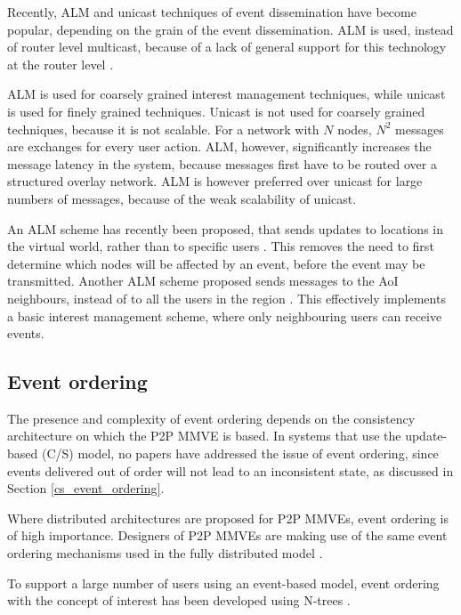 Recently, ALM and unicast techniques of event dissemination have become popular, depending on the grain of the event dissemination. ALM is used, instead of router level multicast, because of a lack of general support for this technology at the router level \cite{ip_multicast_deployment_issues}.

ALM is used for coarsely grained interest management techniques, while unicast is used for finely grained techniques. Unicast is not used for
coarsely grained techniques, because it is not scalable. For a network with $N$ nodes, $N^2$ messages are exchanges for every user action. ALM,
however, significantly increases the message latency in the system, because messages first have to be routed over a structured overlay network. ALM
is however preferred over unicast for large numbers of messages, because of the weak scalability of unicast.

An ALM scheme has recently been proposed, that sends updates to locations in the virtual world, rather than to specific users
\cite{Ghaffari_Delaunay_churn_mobility}. This removes the need to first determine which nodes will be affected by an event, before the event may be
transmitted. Another ALM scheme proposed sends messages to the AoI neighbours, instead of to all the users in the region
\cite{Seeger_area_based_gossip_multicast}. This effectively implements a basic interest management scheme, where only neighbouring users can
receive events.

\subsection{Event ordering}

The presence and complexity of event ordering depends on the consistency architecture on which the P2P MMVE is based. In systems that use the update-based (C/S) model, no papers have addressed the issue of event ordering, since events delivered out of order will not lead to an inconsistent state, as discussed in Section \ref{cs_event_ordering}.

Where distributed architectures are proposed for P2P MMVEs, event ordering is of high importance. Designers of P2P MMVEs are making use of the same event ordering mechanisms used in the fully distributed model \cite{hybrid_storage1}.

To support a large number of users using an event-based model, event ordering with the concept of interest has been developed using N-trees \cite{GauthierDickey_ntrees}.

